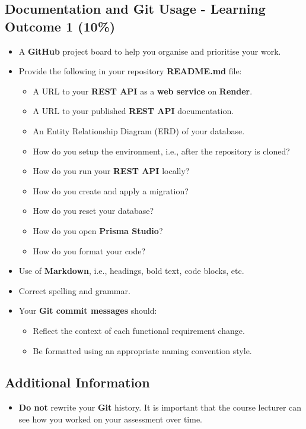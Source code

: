 \documentclass{article}
\begin{document}
\subsection*{Documentation and Git Usage - Learning Outcome 1 (10\%)}
\begin{itemize}
	\item A \textbf{GitHub} project board to help you organise and prioritise your work. 
    \item Provide the following in your repository \textbf{README.md} file:
    \begin{itemize} 
		\item A URL to your \textbf{REST API} as a \textbf{web service} on \textbf{Render}.
		\item A URL to your published \textbf{REST API} documentation. 
		\item An Entity Relationship Diagram (ERD) of your database.
      \item How do you setup the environment, i.e., after the repository is cloned?
	  \item How do you run your \textbf{REST API} locally?
	  \item How do you create and apply a migration?  
	  \item How do you reset your database?
	  \item How do you open \textbf{Prisma Studio}?
	  \item How do you format your code?
    \end{itemize}
    \item Use of \textbf{Markdown}, i.e., headings, bold text, code blocks, etc.
    \item Correct spelling and grammar.
    \item Your \textbf{Git commit messages} should:
    \begin{itemize}
      \item Reflect the context of each functional requirement change.
      \item Be formatted using an appropriate naming convention style.
    \end{itemize}	
\end{itemize}

\subsection*{Additional Information}
\begin{itemize}
    \item \textbf{Do not} rewrite your \textbf{Git} history. It is important that the course lecturer can see how you worked on your assessment over time. 
\end{itemize} 
\end{document}
